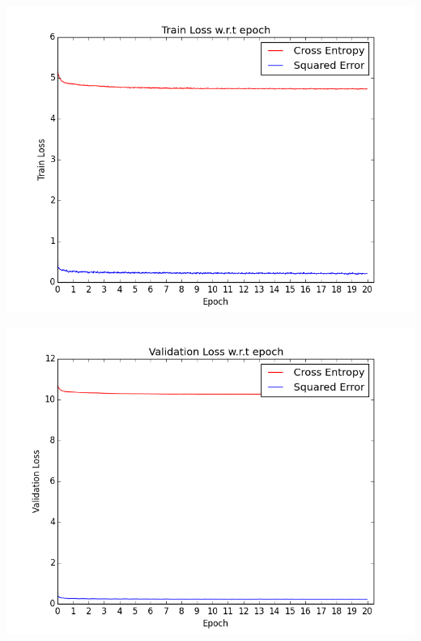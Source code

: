 \documentclass[12pt]{report}
\begin{document}
\begin{center}
    \includegraphics[scale=0.8]{train_7}
\end{center}

\begin{center}
    \includegraphics[scale=0.8]{val_7}
\end{center}
\end{document}
